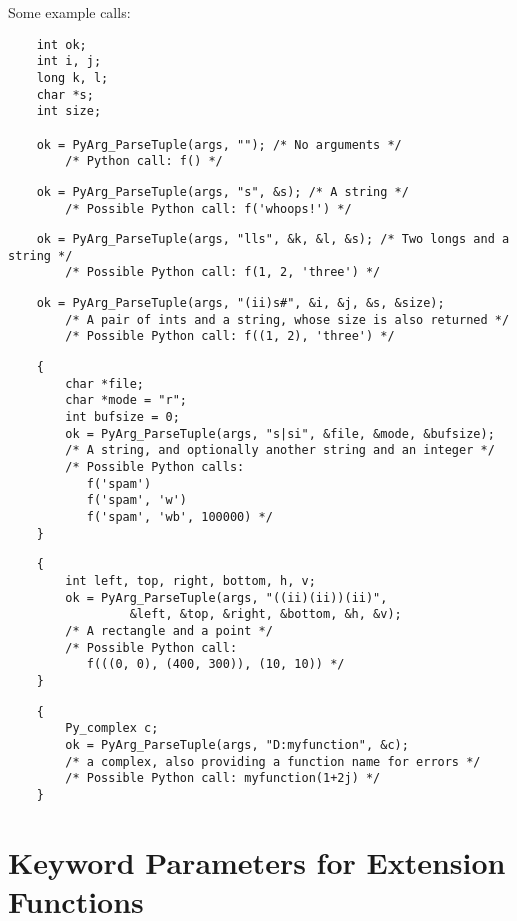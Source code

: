 Some example calls:

\begin{verbatim}
    int ok;
    int i, j;
    long k, l;
    char *s;
    int size;

    ok = PyArg_ParseTuple(args, ""); /* No arguments */
        /* Python call: f() */
\end{verbatim}

\begin{verbatim}
    ok = PyArg_ParseTuple(args, "s", &s); /* A string */
        /* Possible Python call: f('whoops!') */
\end{verbatim}

\begin{verbatim}
    ok = PyArg_ParseTuple(args, "lls", &k, &l, &s); /* Two longs and a string */
        /* Possible Python call: f(1, 2, 'three') */
\end{verbatim}

\begin{verbatim}
    ok = PyArg_ParseTuple(args, "(ii)s#", &i, &j, &s, &size);
        /* A pair of ints and a string, whose size is also returned */
        /* Possible Python call: f((1, 2), 'three') */
\end{verbatim}

\begin{verbatim}
    {
        char *file;
        char *mode = "r";
        int bufsize = 0;
        ok = PyArg_ParseTuple(args, "s|si", &file, &mode, &bufsize);
        /* A string, and optionally another string and an integer */
        /* Possible Python calls:
           f('spam')
           f('spam', 'w')
           f('spam', 'wb', 100000) */
    }
\end{verbatim}

\begin{verbatim}
    {
        int left, top, right, bottom, h, v;
        ok = PyArg_ParseTuple(args, "((ii)(ii))(ii)",
                 &left, &top, &right, &bottom, &h, &v);
        /* A rectangle and a point */
        /* Possible Python call:
           f(((0, 0), (400, 300)), (10, 10)) */
    }
\end{verbatim}

\begin{verbatim}
    {
        Py_complex c;
        ok = PyArg_ParseTuple(args, "D:myfunction", &c);
        /* a complex, also providing a function name for errors */
        /* Possible Python call: myfunction(1+2j) */
    }
\end{verbatim}


\section{Keyword Parameters for Extension Functions
         \label{parseTupleAndKeywords}}

